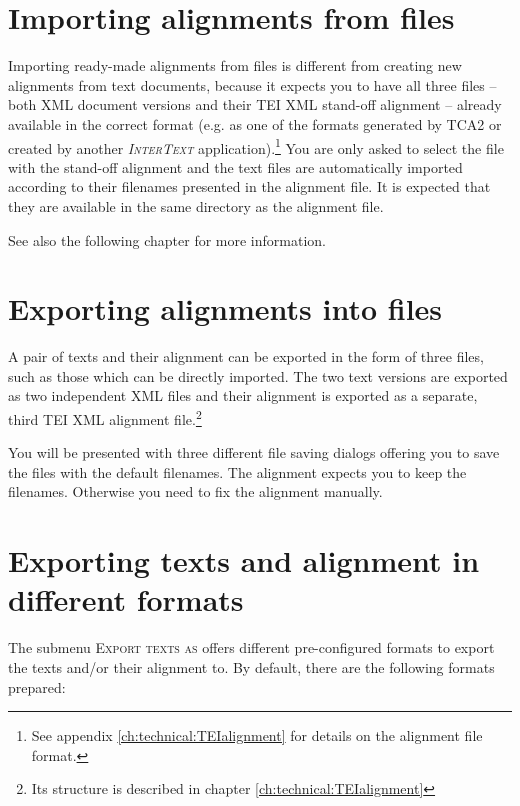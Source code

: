 \documentclass[a4paper,10pt,oneside]{book}
\newcommand{\IT}{\textit{\textsc{InterText}}\xspace}
\newcommand{\menu}[1]{\textsc{#1}}
\begin{document}
\section{Importing alignments from files}\label{ch:detail:managing_local:import}

Importing ready-made alignments from files is different from creating new alignments from text documents, because it expects you to have all three files -- both XML document versions and their TEI XML stand-off alignment -- already available in the correct format (e.g. as one of the formats generated by TCA2 or created by another \IT application).\footnote{See appendix \ref{ch:technical:TEIalignment} for details on the alignment file format.} You are only asked to select the file with the stand-off alignment and the text files are automatically imported according to their filenames presented in the alignment file. It is expected that they are available in the same directory as the alignment file.

See also the following chapter for more information.

\section{Exporting alignments into files}\label{ch:detail:managing_local:export}

A pair of texts and their alignment can be exported in the form of three files, such as those which can be directly imported. The two text versions are exported as two independent XML files and their alignment is exported as a separate, third TEI XML alignment file.\footnote{Its structure is described in chapter \ref{ch:technical:TEIalignment}}

You will be presented with three different file saving dialogs offering you to save the files with the default filenames. The alignment expects you to keep the filenames. Otherwise you need to fix the alignment manually.

\section{Exporting texts and alignment in different formats}\label{ch:detail:managing_local:export_texts}

The submenu \menu{Export texts as} offers different pre-configured formats to export the texts and/or their alignment to. By default, there are the following formats prepared:
\end{document}
